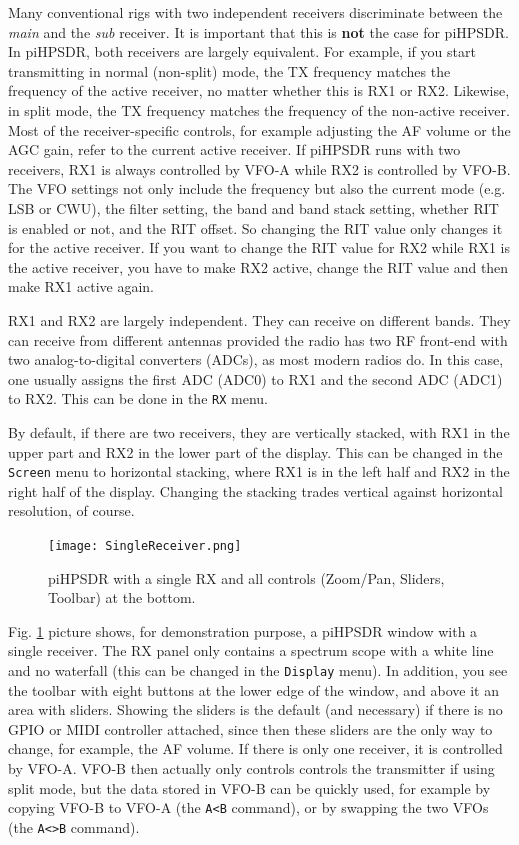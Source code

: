 \documentclass[12pt]{book}
\def\bltt#1{\texttt{\color{blue}#1}}
\def\pH{pi\-HPSDR\xspace}
\begin{document}
Many conventional rigs with two independent receivers discriminate
between the \textit{main} and the \textit{sub} receiver. It is important that
this is \textbf{not} the case for \pH. In \pH, both  receivers are
largely equivalent. For example, if you start transmitting in
normal (non-split) mode, the TX frequency matches the frequency
of the active receiver, no matter whether this is RX1 or RX2.
Likewise, in split mode, the TX frequency matches the frequency
of the non-active receiver. Most of the receiver-specific controls,
for example adjusting the AF volume or the AGC gain, refer to the
current active receiver. If \pH runs with two receivers,
RX1 is always controlled by VFO-A while RX2 is controlled by VFO-B.
The VFO settings not only include the frequency but also the
current mode (e.g. LSB or CWU), the filter setting, the band and
band stack setting, whether RIT is enabled or not, and the RIT
offset. So changing the RIT value only changes it for the active
receiver. If you want  to change the RIT value for RX2 while RX1 is
the active receiver, you have to make RX2 active, change the RIT
value and then make RX1 active again.

RX1 and RX2 are largely independent. They can receive on different
bands. They can receive from different antennas provided the radio
has two RF front-end with two analog-to-digital converters (ADCs),
as most modern radios do. In this case, one usually
assigns the first ADC (ADC0) to RX1 and the second ADC (ADC1) to
RX2. This can be done in the \bltt{RX} menu.

By default, if there are two receivers, they are vertically stacked,
with RX1 in the upper part and RX2 in the lower part of the display.
This can be changed in the \bltt{Screen} menu to horizontal stacking,
where RX1 is  in the left half and RX2 in the right half of  the
display. Changing the stacking trades vertical against horizontal
resolution, of course.

\begin{figure}[ht]
\center
\texttt{[image: SingleReceiver.png]}
\caption{\pH with a single RX and all controls (Zoom/Pan,
Sliders, Toolbar) at the  bottom.}
\label{fig:SingleReceiver}
\end{figure}

Fig. \ref{fig:SingleReceiver} picture shows, for demonstration purpose, a \pH
window with a single receiver.
The RX panel only contains a
spectrum scope with a white line and no waterfall (this can be changed in the
\bltt{Display} menu). In addition, you see the toolbar
with eight buttons at the lower edge of the window, and above
it an area with sliders. Showing the sliders is the default
(and necessary) if there is no GPIO or MIDI controller attached,
since then these sliders are the only way to change, for example,
the AF volume. If there is only one receiver, it is controlled
by VFO-A. VFO-B then actually only controls controls the transmitter
if using split mode, but the data stored in VFO-B can
be quickly used, for example by copying VFO-B to VFO-A (the
\bltt{A<B} command), or by swapping the two VFOs (the \bltt{A<>B} command).
\end{document}
